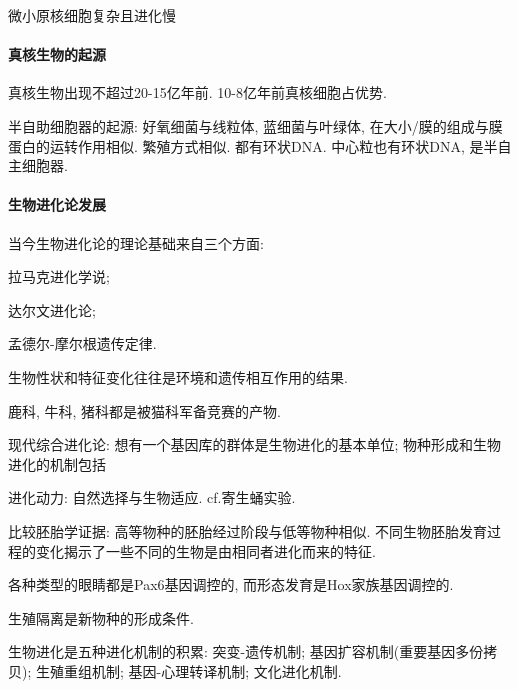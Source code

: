 \documentclass{ctexart}
\begin{document}

\par
微小原核细胞复杂且进化慢

\paragraph{真核生物的起源} %
\label{par:真核生物的起源}

真核生物出现不超过20-15亿年前. 10-8亿年前真核细胞占优势.
\par
半自助细胞器的起源: 好氧细菌与线粒体, 蓝细菌与叶绿体, 在大小/膜的组成与膜蛋白的运转作用相似. 繁殖方式相似. 都有环状DNA. 中心粒也有环状DNA, 是半自主细胞器.


\paragraph{生物进化论发展} %
\label{par:生物进化论发展}

当今生物进化论的理论基础来自三个方面:
\begin{cenum}
    \item 拉马克进化学说;
    \item 达尔文进化论;
    \item 孟德尔-摩尔根遗传定律.
\end{cenum}

生物性状和特征变化往往是环境和遗传相互作用的结果.
\begin{ex}
    鹿科, 牛科, 猪科都是被猫科军备竞赛的产物.
\end{ex}

现代综合进化论: 想有一个基因库的群体是生物进化的基本单位; 物种形成和生物进化的机制包括
\par
进化动力: 自然选择与生物适应. cf.寄生蛹实验.
\par
比较胚胎学证据: 高等物种的胚胎经过阶段与低等物种相似. 不同生物胚胎发育过程的变化揭示了一些不同的生物是由相同者进化而来的特征.
\begin{ex}
    各种类型的眼睛都是Pax6基因调控的, 而形态发育是Hox家族基因调控的.
\end{ex}
生殖隔离是新物种的形成条件.
\par
生物进化是五种进化机制的积累: 突变-遗传机制; 基因扩容机制(重要基因多份拷贝); 生殖重组机制; 基因-心理转译机制; 文化进化机制.


\end{document}
